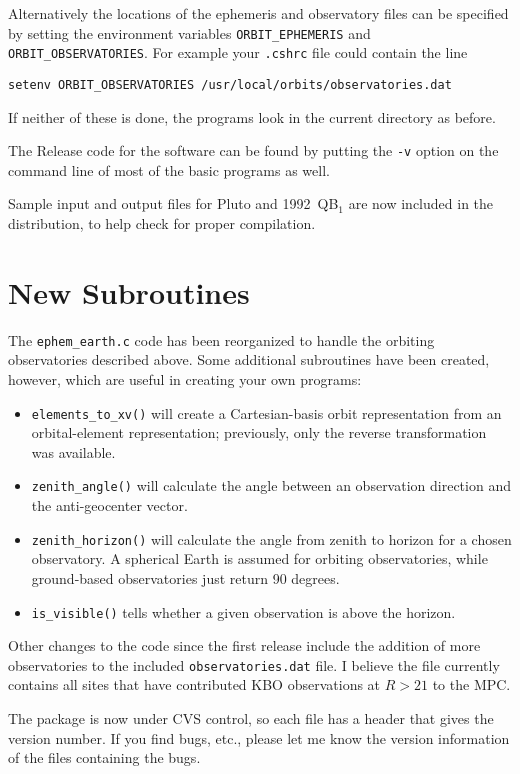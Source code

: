 Alternatively the locations of the ephemeris and observatory files can
be specified by setting the environment variables {\tt ORBIT\_EPHEMERIS}
and {\tt ORBIT\_OBSERVATORIES}.  For example your {\tt .cshrc} file
could contain the line

\noindent
{\tt setenv ORBIT\_OBSERVATORIES /usr/local/orbits/observatories.dat}

\noindent
If neither of these is done, the programs look in the current
directory as before.

The Release code for the software can be found by putting the {\tt -v}
option on the command line of most of the basic programs as well.

Sample input and output files for Pluto and 1992~QB$_1$ are now
included in the distribution, to help check for proper compilation.

\section{New Subroutines}
The {\tt ephem\_earth.c} code has been reorganized to handle the
orbiting observatories described above.  Some additional subroutines
have been created, however, which are useful in creating your own
programs: 
\begin{itemize}
\item {\tt elements\_to\_xv()} will create a Cartesian-basis orbit
representation from an orbital-element representation; previously,
only the reverse transformation was available.
\item {\tt zenith\_angle()} will calculate the angle between an
observation direction and the anti-geocenter vector.
\item {\tt zenith\_horizon()} will calculate the angle from zenith to
horizon for a chosen observatory.  A spherical Earth is assumed for
orbiting observatories, while ground-based observatories just return
90 degrees.
\item {\tt is\_visible()} tells whether a given observation is above
the horizon.
\end{itemize}


Other changes to the code since the first release include the addition
of more observatories to the included {\tt observatories.dat} file.  I
believe the file currently contains all sites that have contributed
KBO observations at $R>21$ to the MPC.

The package is now under CVS control, so each file has a header that
gives the version number.  If you find bugs, etc., please let me know
the version information of the files containing the bugs.

